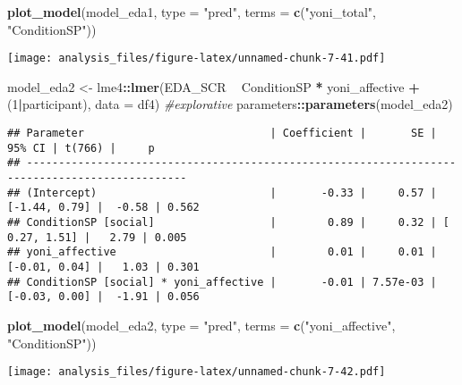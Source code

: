 \documentclass[
]{article}
\newenvironment{Shaded}{\begin{snugshade}}{\end{snugshade}}
\newcommand{\CommentTok}[1]{\textcolor[rgb]{0.56,0.35,0.01}{\textit{#1}}}
\newcommand{\DataTypeTok}[1]{\textcolor[rgb]{0.13,0.29,0.53}{#1}}
\newcommand{\DecValTok}[1]{\textcolor[rgb]{0.00,0.00,0.81}{#1}}
\newcommand{\KeywordTok}[1]{\textcolor[rgb]{0.13,0.29,0.53}{\textbf{#1}}}
\newcommand{\NormalTok}[1]{#1}
\newcommand{\OperatorTok}[1]{\textcolor[rgb]{0.81,0.36,0.00}{\textbf{#1}}}
\newcommand{\StringTok}[1]{\textcolor[rgb]{0.31,0.60,0.02}{#1}}
\begin{document}
\begin{Shaded}
\begin{Highlighting}[]
\KeywordTok{plot_model}\NormalTok{(model_eda1, }\DataTypeTok{type =} \StringTok{"pred"}\NormalTok{, }\DataTypeTok{terms =} \KeywordTok{c}\NormalTok{(}\StringTok{"yoni_total"}\NormalTok{, }\StringTok{"ConditionSP"}\NormalTok{))}
\end{Highlighting}
\end{Shaded}

\texttt{[image: analysis\_files/figure-latex/unnamed-chunk-7-41.pdf]}

\begin{Shaded}
\begin{Highlighting}[]
\NormalTok{model_eda2 <-}\StringTok{ }\NormalTok{lme4}\OperatorTok{::}\KeywordTok{lmer}\NormalTok{(EDA_SCR }\OperatorTok{~}\StringTok{ }\NormalTok{ConditionSP }\OperatorTok{*}\StringTok{ }\NormalTok{yoni_affective }\OperatorTok{+}\StringTok{ }\NormalTok{(}\DecValTok{1}\OperatorTok{|}\NormalTok{participant), }\DataTypeTok{data =}\NormalTok{ df4)  }\CommentTok{#explorative}
\NormalTok{parameters}\OperatorTok{::}\KeywordTok{parameters}\NormalTok{(model_eda2)}
\end{Highlighting}
\end{Shaded}

\begin{verbatim}
## Parameter                             | Coefficient |       SE |        95% CI | t(766) |     p
## -----------------------------------------------------------------------------------------------
## (Intercept)                           |       -0.33 |     0.57 | [-1.44, 0.79] |  -0.58 | 0.562
## ConditionSP [social]                  |        0.89 |     0.32 | [ 0.27, 1.51] |   2.79 | 0.005
## yoni_affective                        |        0.01 |     0.01 | [-0.01, 0.04] |   1.03 | 0.301
## ConditionSP [social] * yoni_affective |       -0.01 | 7.57e-03 | [-0.03, 0.00] |  -1.91 | 0.056
\end{verbatim}

\begin{Shaded}
\begin{Highlighting}[]
\KeywordTok{plot_model}\NormalTok{(model_eda2, }\DataTypeTok{type =} \StringTok{"pred"}\NormalTok{, }\DataTypeTok{terms =} \KeywordTok{c}\NormalTok{(}\StringTok{"yoni_affective"}\NormalTok{, }\StringTok{"ConditionSP"}\NormalTok{))}
\end{Highlighting}
\end{Shaded}

\texttt{[image: analysis\_files/figure-latex/unnamed-chunk-7-42.pdf]}
\end{document}
